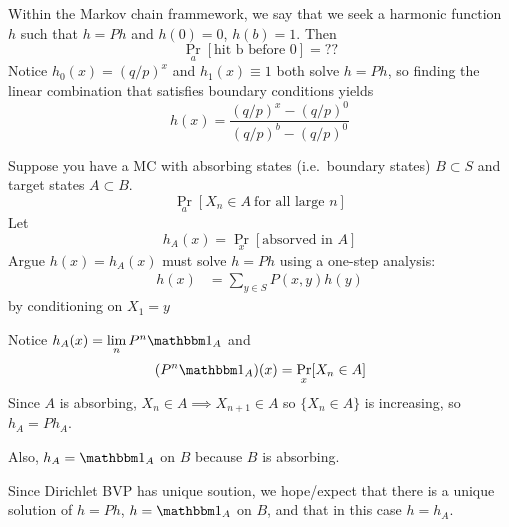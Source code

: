\begin{example}
  Within the Markov chain frammework, we say that we seek a harmonic function $h$
  such that $h = P h$ and $h(0) = 0$, $h(b) = 1$. Then
  \[
    \Pr_a[\text{hit b before 0}] = ??
  \]
  Notice $h_0(x) = (q/p)^x$ and $h_1(x) \equiv 1$ both solve $h = P h$,
  so finding the linear combination that satisfies boundary
  conditions yields
  \[
    h(x) = \frac{(q/p)^x - (q/p)^0}{(q/p)^b - (q/p)^0}
  \]
\end{example}


\begin{theorem}
  Suppose you have a MC with absorbing states (i.e.\ boundary states)
  $B \subset S$ and target states $A \subset B$.
  \[
    \Pr_a\left[X_n \in A~\text{for all large $n$}\right]
  \]
  Let
  \[
    h_A(x)
    = \Pr_x[\text{absorved in $A$}]
  \]
  Argue $h(x) = h_A(x)$ must solve $h = P h$ using a one-step analysis:
  \begin{align*}
    h(x) &= \sum_{y \in S} P(x,y) h(y)
  \end{align*}
  by conditioning on $X_1 = y$

    Notice $h_A(x) = \lim_n P^n \ind_A$ and
    \[
      (P^n \ind_A)(x) = \Pr_x[X_n \in A]
    \]
    Since $A$ is absorbing, $X_n \in A \implies X_{n+1} \in A$ so
    $\{X_n \in A\}$ is increasing, so $h_A = P h_A$.

    Also, $h_A = \ind_A$ on $B$ because $B$ is absorbing.
\end{theorem}

Since Dirichlet BVP has unique soution, we hope/expect that there is a
unique solution of $h = P h$, $h = \ind_A$ on $B$, and that in this
case $h = h_A$.

